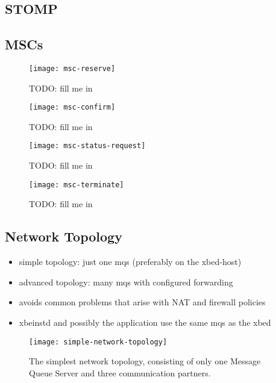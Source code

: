 \subsection{STOMP}
\label{sec:protocol:stomp}

\subsection{MSCs}

\begin{figure}[ht]
  \centering
  \texttt{[image: msc-reserve]}
  \caption[MSC Make Reservation]{TODO: fill me in}
  \label{fig:msc-reserve}
\end{figure}

\begin{figure}[ht]
  \centering
  \texttt{[image: msc-confirm]}
  \caption[MSC Confirm Reservation]{TODO: fill me in}
  \label{fig:msc-confirm}
\end{figure}

\begin{figure}[ht]
  \centering
  \texttt{[image: msc-status-request]}
  \caption[MSC Request Task Status]{TODO: fill me in}
  \label{fig:msc-status-request}
\end{figure}

\begin{figure}[ht]
  \centering
  \texttt{[image: msc-terminate]}
  \caption[MSC Terminate Task Request]{TODO: fill me in}
  \label{fig:msc-terminate}
\end{figure}

\subsection{Network Topology}
\label{sec:network-topology}

\begin{itemize}
\item simple topology: just one mqs (preferably on the xbed-host)
\item advanced topology: many mqs with configured forwarding
\item avoids common problems that arise with NAT and firewall policies
\item xbeinstd and possibly the application use the same mqs as the xbed
\end{itemize}

\begin{figure}[ht]
  \centering
  \texttt{[image: simple-network-topology]}
  \caption[Network  Topology   (simple)]{The  simplest  network  topology,
    consisting of  only one Message  Queue Server and  three communication
    partners.}
  \label{fig:simple-net-top}
\end{figure}

